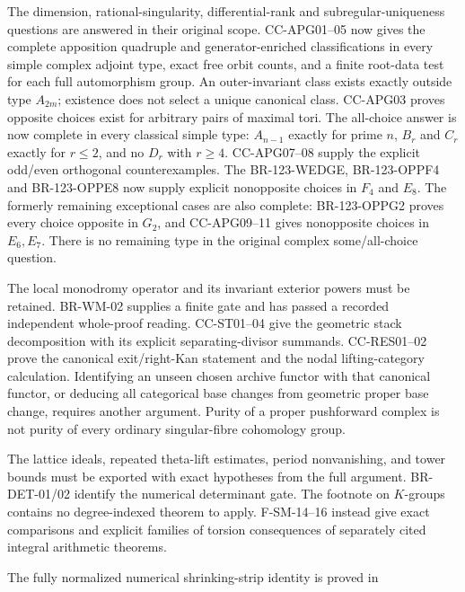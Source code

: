 \begin{description}[style=nextline,leftmargin=0pt]
\item[Cote 123: the original apposition questions are now closed.]
The dimension, rational-singularity, differential-rank and
subregular-uniqueness questions are answered in their original scope.
CC-APG01--05 now gives the complete apposition quadruple and
generator-enriched classifications in every simple complex adjoint
type, exact free orbit counts, and a finite root-data test for each
full automorphism group. An outer-invariant class exists exactly
outside type $A_{2m}$; existence does not select a unique canonical
class. CC-APG03 proves opposite choices exist for arbitrary pairs of
maximal tori. The all-choice answer is now complete in every classical simple
type: $A_{n-1}$ exactly for prime $n$, $B_r$ and $C_r$ exactly
for $r\leq2$, and no $D_r$ with $r\geq4$. CC-APG07--08
supply the explicit odd/even orthogonal counterexamples. The
BR-123-WEDGE, BR-123-OPPF4 and BR-123-OPPE8 now supply
explicit nonopposite choices in $F_4$ and $E_8$.  The formerly remaining
exceptional cases are also complete: BR-123-OPPG2 proves every
choice opposite in $G_2$, and CC-APG09--11 gives nonopposite
choices in $E_6,E_7$. There is no remaining type in the original
complex some/all-choice question.
\item[Weight--monodromy and universal-curve categories.]
The local monodromy operator and its invariant exterior powers must
be retained. BR-WM-02 supplies a finite gate and has passed a
recorded independent whole-proof reading. CC-ST01--04 give the geometric
stack decomposition with its explicit separating-divisor summands.
CC-RES01--02 prove the canonical exit/right-Kan statement and the nodal
lifting-category calculation. Identifying an unseen chosen archive
functor with that canonical functor, or deducing all categorical base
changes from geometric proper base change, requires another argument.
Purity of a proper pushforward
complex is not purity of every ordinary singular-fibre cohomology group.
\item[The analytic method as a transferable theorem.]
The lattice ideals, repeated theta-lift estimates, period nonvanishing,
and tower bounds must be exported with exact hypotheses from the
full argument. BR-DET-01/02 identify the numerical determinant gate.
The footnote on $K$-groups contains no degree-indexed theorem to apply.
F-SM-14--16 instead give exact comparisons and explicit families of
torsion consequences of separately cited integral arithmetic theorems.
\item[Masullo's operator realization.]
The fully normalized numerical shrinking-strip identity is proved in

\end{description}

